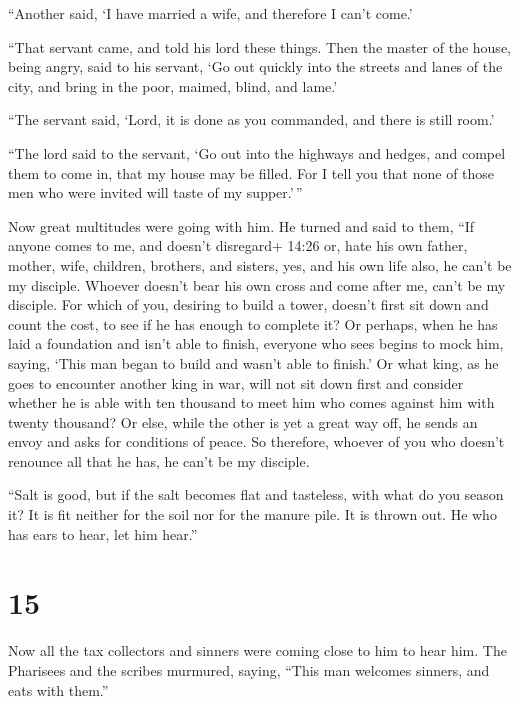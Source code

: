  ``Another said, `I have married a wife, and therefore I
can't come.'

 ``That servant came, and told his lord these things. Then
the master of the house, being angry, said to his servant, `Go out
quickly into the streets and lanes of the city, and bring in the poor,
maimed, blind, and lame.'

 ``The servant said, `Lord, it is done as you commanded,
and there is still room.'

 ``The lord said to the servant, `Go out into the highways
and hedges, and compel them to come in, that my house may be filled.
 For I tell you that none of those men who were invited
will taste of my supper.'\,''

 Now great multitudes were going with him. He turned and
said to them,  ``If anyone comes to me, and doesn't
disregard+ 14:26 or, hate his own father, mother, wife, children,
brothers, and sisters, yes, and his own life also, he can't be my
disciple.  Whoever doesn't bear his own cross and come
after me, can't be my disciple.  For which of you, desiring
to build a tower, doesn't first sit down and count the cost, to see if
he has enough to complete it?  Or perhaps, when he has laid
a foundation and isn't able to finish, everyone who sees begins to mock
him,  saying, `This man began to build and wasn't able to
finish.'  Or what king, as he goes to encounter another
king in war, will not sit down first and consider whether he is able
with ten thousand to meet him who comes against him with twenty
thousand?  Or else, while the other is yet a great way off,
he sends an envoy and asks for conditions of peace.  So
therefore, whoever of you who doesn't renounce all that he has, he can't
be my disciple.

 ``Salt is good, but if the salt becomes flat and
tasteless, with what do you season it?  It is fit neither
for the soil nor for the manure pile. It is thrown out. He who has ears
to hear, let him hear.''

\hypertarget{section-14}{%
\section{15}\label{section-14}}

 Now all the tax collectors and sinners were coming close to
him to hear him.  The Pharisees and the scribes murmured,
saying, ``This man welcomes sinners, and eats with them.''

